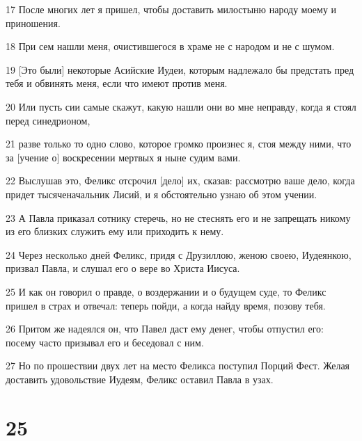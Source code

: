 \par 17 После многих лет я пришел, чтобы доставить милостыню народу моему и приношения.
\par 18 При сем нашли меня, очистившегося в храме не с народом и не с шумом.
\par 19 [Это были] некоторые Асийские Иудеи, которым надлежало бы предстать пред тебя и обвинять меня, если что имеют против меня.
\par 20 Или пусть сии самые скажут, какую нашли они во мне неправду, когда я стоял перед синедрионом,
\par 21 разве только то одно слово, которое громко произнес я, стоя между ними, что за [учение о] воскресении мертвых я ныне судим вами.
\par 22 Выслушав это, Феликс отсрочил [дело] их, сказав: рассмотрю ваше дело, когда придет тысяченачальник Лисий, и я обстоятельно узнаю об этом учении.
\par 23 А Павла приказал сотнику стеречь, но не стеснять его и не запрещать никому из его близких служить ему или приходить к нему.
\par 24 Через несколько дней Феликс, придя с Друзиллою, женою своею, Иудеянкою, призвал Павла, и слушал его о вере во Христа Иисуса.
\par 25 И как он говорил о правде, о воздержании и о будущем суде, то Феликс пришел в страх и отвечал: теперь пойди, а когда найду время, позову тебя.
\par 26 Притом же надеялся он, что Павел даст ему денег, чтобы отпустил его: посему часто призывал его и беседовал с ним.
\par 27 Но по прошествии двух лет на место Феликса поступил Порций Фест. Желая доставить удовольствие Иудеям, Феликс оставил Павла в узах.

\chapter{25}

